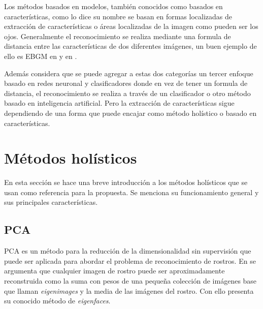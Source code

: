 Los métodos basados en modelos, también conocidos como basados en características, como lo dice su nombre se basan en formas localizadas de extracción de características o áreas localizadas de la imagen como pueden ser los ojos.
Generalmente el reconocimiento se realiza mediante una formula de distancia entre las características de dos diferentes imágenes, un buen ejemplo de ello es \ac{EBGM} en \cite{wiskott1997face} y en \cite{bolme2003elastic}.

Además \cite{zhao2003face} considera que se puede agregar a estas dos categorías un tercer enfoque basado en redes neuronal y clasificadores donde en vez de tener un formula de distancia, el reconocimiento se realiza a través de un clasificador o otro método basado en inteligencia artificial. Pero la extracción de características sigue dependiendo de una forma que puede encajar como método holístico o basado en características.

\section{Métodos holísticos}
En esta sección se hace una breve introducción a los métodos holísticos que se usan como referencia para la propuesta. Se menciona su funcionamiento general y sus principales características.


\subsection{\acf{PCA}}
\ac{PCA} es un método para la reducción de la dimensionalidad sin supervisión que puede ser aplicada para abordar el problema de reconocimiento de rostros. En \cite{sirovich1987low} se argumenta que cualquier imagen de rostro puede ser aproximadamente reconstruida como la suma con pesos de una pequeña colección de imágenes base que llaman \textit{eigenimages} y la media de las imágenes del rostro. Con ello \cite{turk1991eigenfaces} presenta su conocido método de \textit{eigenfaces}.



